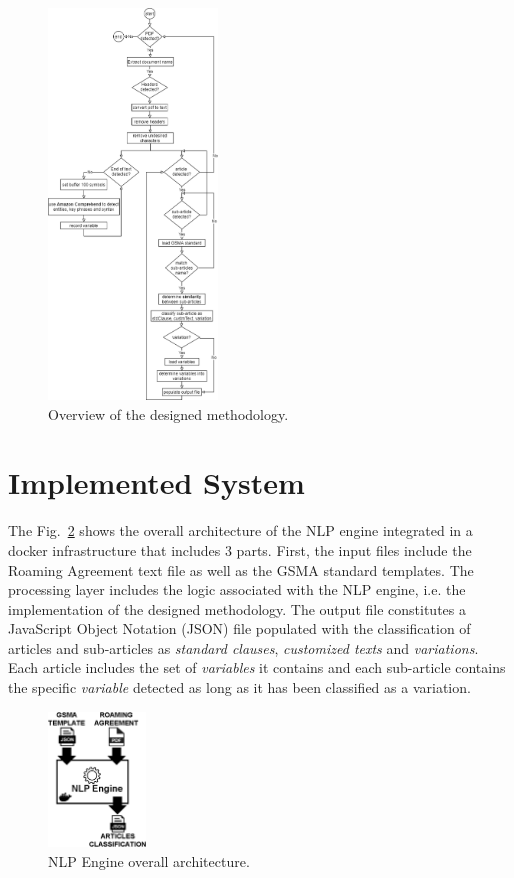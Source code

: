 \documentclass[conference]{style/IEEEtran}
\begin{document}
\begin{figure}[htbp]
\centerline{\includegraphics[width=0.4\textwidth]{images/methodology.png}}
\caption{Overview of the designed methodology.}
\label{fig1}
\end{figure}

\section{Implemented System}
The Fig.~\ref{fig2} shows the overall architecture of the NLP engine integrated in a docker infrastructure that includes 3 parts. First, the input files include the Roaming Agreement text file as well as the GSMA standard templates. The processing layer includes the logic associated with the NLP engine, i.e. the implementation of the designed methodology. The output file constitutes a JavaScript Object Notation (JSON) file populated with the classification of articles and sub-articles as \textit{standard clauses}, \textit{customized texts} and \textit{variations}. Each article includes the set of \textit{variables} it contains and each sub-article contains the specific \textit{variable} detected as long as it has been classified as a variation.

\begin{figure}[htbp]
\centerline{\includegraphics[width=0.23\textwidth]{images/NLP_Engine.png}}
\caption{NLP Engine overall architecture.}
\label{fig2}
\end{figure}
\end{document}
